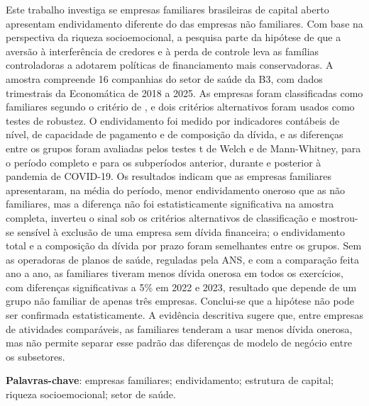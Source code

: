 \begin{resumo}
Este trabalho investiga se empresas familiares brasileiras de capital aberto
apresentam endividamento diferente do das empresas não familiares. Com base na
perspectiva da riqueza socioemocional, a pesquisa parte da hipótese de que a
aversão à interferência de credores e à perda de controle leva as famílias
controladoras a adotarem políticas de financiamento mais conservadoras. A amostra
compreende 16 companhias do setor de saúde da B3, com dados trimestrais da
Economática de 2018 a 2025. As empresas foram classificadas como familiares
segundo o critério de , e dois critérios alternativos foram
usados como testes de robustez. O endividamento foi medido por indicadores
contábeis de nível, de capacidade de pagamento e de composição da dívida, e as
diferenças entre os grupos foram avaliadas pelos testes t de Welch e de
Mann-Whitney, para o período completo e para os subperíodos anterior, durante e
posterior à pandemia de COVID-19. Os resultados indicam que as empresas
familiares apresentaram, na média do período, menor endividamento oneroso que as
não familiares, mas a diferença não foi estatisticamente significativa na amostra
completa, inverteu o sinal sob os critérios alternativos de classificação e
mostrou-se sensível à exclusão de uma empresa sem dívida financeira; o
endividamento total e a composição da dívida por prazo foram semelhantes entre os
grupos. Sem as operadoras de planos de saúde, reguladas pela ANS, e com a
comparação feita ano a ano, as familiares tiveram menos dívida onerosa em todos os
exercícios, com diferenças significativas a 5\% em 2022 e 2023, resultado que
depende de um grupo não familiar de apenas três empresas. Conclui-se que a hipótese
não pode ser confirmada estatisticamente. A evidência descritiva sugere que, entre
empresas de atividades comparáveis, as familiares tenderam a usar menos dívida
onerosa, mas não permite separar esse padrão das diferenças de modelo de negócio
entre os subsetores.

\textbf{Palavras-chave}: empresas familiares; endividamento; estrutura de capital;
riqueza socioemocional; setor de saúde.
\end{resumo}
